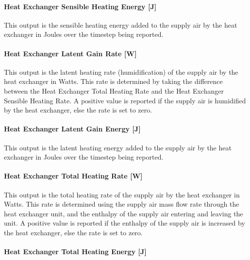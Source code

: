 \paragraph{Heat Exchanger Sensible Heating Energy {[}J{]}}\label{heat-exchanger-sensible-heating-energy-j-1}

This output is the sensible heating energy added to the supply air by the heat exchanger in Joules over the timestep being reported.

\paragraph{Heat Exchanger Latent Gain Rate {[}W{]}}\label{heat-exchanger-latent-gain-rate-w-1}

This output is the latent heating rate (humidification) of the supply air by the heat exchanger in Watts. This rate is determined by taking the difference between the Heat Exchanger Total Heating Rate and the Heat Exchanger Sensible Heating Rate. A positive value is reported if the supply air is humidified by the heat exchanger, else the rate is set to zero.

\paragraph{Heat Exchanger Latent Gain Energy {[}J{]}}\label{heat-exchanger-latent-gain-energy-j}

This output is the latent heating energy added to the supply air by the heat exchanger in Joules over the timestep being reported.

\paragraph{Heat Exchanger Total Heating Rate {[}W{]}}\label{heat-exchanger-total-heating-rate-w-1}

This output is the total heating rate of the supply air by the heat exchanger in Watts. This rate is determined using the supply air mass flow rate through the heat exchanger unit, and the enthalpy of the supply air entering and leaving the unit. A positive value is reported if the enthalpy of the supply air is increased by the heat exchanger, else the rate is set to zero.

\paragraph{Heat Exchanger Total Heating Energy {[}J{]}}\label{heat-exchanger-total-heating-energy-j-1}

